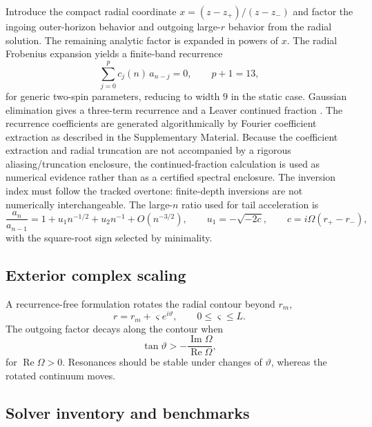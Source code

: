 \documentclass[10pt]{article}
\theoremstyle{plain}
\newcommand{\Rey}{\operatorname{Re}}
\newcommand{\Imy}{\operatorname{Im}}
\begin{document}
Introduce the compact radial coordinate $x=(z-z_+)/(z-z_-)$ and factor the
ingoing outer-horizon behavior and outgoing large-$r$ behavior from the radial
solution. The remaining analytic factor is expanded in powers of $x$. The
radial Frobenius expansion yields a finite-band recurrence
\begin{equation}
\sum_{j=0}^{p}c_j(n)\,a_{n-j}=0,\qquad p+1=13,
\end{equation}
for generic two-spin parameters, reducing to width $9$ in the static case.
Gaussian elimination gives a three-term recurrence and a Leaver continued
fraction \citep{leaver1985}. The recurrence coefficients are generated
algorithmically by Fourier coefficient extraction as described in the
Supplementary Material. Because the coefficient extraction and radial
truncation are not accompanied by a rigorous aliasing/truncation enclosure, the
continued-fraction calculation is used as numerical evidence rather than as a
certified spectral enclosure. The inversion index must follow the tracked
overtone: finite-depth inversions are not numerically interchangeable. The
large-$n$ ratio used for tail acceleration is
\begin{equation}
\frac{a_n}{a_{n-1}}=1+u_1n^{-1/2}+u_2n^{-1}+O(n^{-3/2}),\qquad
u_1=-\sqrt{-2c},\qquad c=i\Omega(r_+-r_-),
\end{equation}
with the square-root sign selected by minimality.

\subsection{Exterior complex scaling}

A recurrence-free formulation rotates the radial contour beyond $r_m$,
\begin{equation}
r=r_m+\varsigma e^{i\vartheta},\qquad 0\leq\varsigma\leq L.
\end{equation}
The outgoing factor decays along the contour when
\begin{equation}
\tan\vartheta>-\frac{\Imy\Omega}{\Rey\Omega},
\label{eq:scaling}
\end{equation}
for $\Rey\Omega>0$. Resonances should be stable under changes of $\vartheta$,
whereas the rotated continuum moves.

\subsection{Solver inventory and benchmarks}
\end{document}
